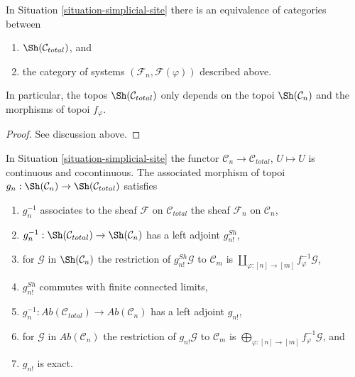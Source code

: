 \begin{lemma}
\label{lemma-describe-sheaves-simplicial-site-site}
In Situation \ref{situation-simplicial-site} there is an equivalence of
categories between
\begin{enumerate}
\item $\Sh(\mathcal{C}_{total})$, and
\item the category of systems $(\mathcal{F}_n, \mathcal{F}(\varphi))$
described above.
\end{enumerate}
In particular, the topos $\Sh(\mathcal{C}_{total})$ only depends on
the topoi $\Sh(\mathcal{C}_n)$ and the morphisms of topoi $f_\varphi$.
\end{lemma}

\begin{proof}
See discussion above.
\end{proof}

\begin{lemma}
\label{lemma-restriction-to-components-site}
In Situation \ref{situation-simplicial-site} the functor
$\mathcal{C}_n \to \mathcal{C}_{total}$, $U \mapsto U$ is continuous
and cocontinuous. The associated morphism of
topoi $g_n : \Sh(\mathcal{C}_n) \to \Sh(\mathcal{C}_{total})$ satisfies
\begin{enumerate}
\item $g_n^{-1}$ associates to the sheaf $\mathcal{F}$ on $\mathcal{C}_{total}$
the sheaf $\mathcal{F}_n$ on $\mathcal{C}_n$,
\item $g_n^{-1} : \Sh(\mathcal{C}_{total}) \to \Sh(\mathcal{C}_n)$
has a left adjoint $g^{Sh}_{n!}$,
\item for $\mathcal{G}$ in $\Sh(\mathcal{C}_n)$ the restriction of
$g_{n!}^{Sh}\mathcal{G}$ to $\mathcal{C}_m$ is
$\coprod\nolimits_{\varphi : [n] \to [m]} f_\varphi^{-1}\mathcal{G}$,
\item $g_{n!}^{Sh}$ commutes with finite connected limits,
\item $g_n^{-1} : \textit{Ab}(\mathcal{C}_{total}) \to
\textit{Ab}(\mathcal{C}_n)$ has a left adjoint $g_{n!}$,
\item for $\mathcal{G}$ in $\textit{Ab}(\mathcal{C}_n)$ the restriction of
$g_{n!}\mathcal{G}$ to $\mathcal{C}_m$ is
$\bigoplus\nolimits_{\varphi : [n] \to [m]} f_\varphi^{-1}\mathcal{G}$, and
\item $g_{n!}$ is exact.
\end{enumerate}
\end{lemma}

